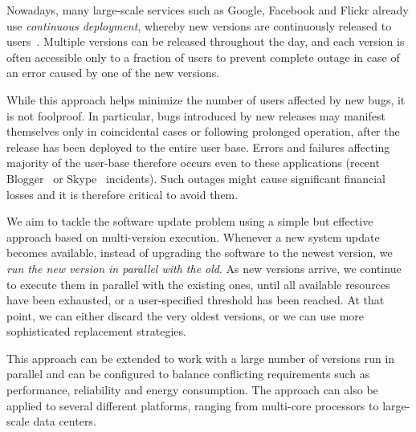Nowadays, many large-scale services such as Google, Facebook and Flickr already
use {\it continuous deployment}, whereby new versions are continuously released
to users~\cite{johnson2009}.  Multiple versions can be released throughout the
day, and each version is often accessible only to a fraction of users to
prevent complete outage in case of an error caused by one of the new versions.

While this approach helps minimize the number of users affected by new bugs, it
is not foolproof. In particular, bugs introduced by new releases may manifest
themselves only in coincidental cases or following prolonged operation, after
the release has been deployed to the entire user base. Errors and failures
affecting majority of the user-base therefore occurs even to these applications
(\eg recent Blogger~\cite{blogger-incident2011} or
Skype~\cite{skype-incident2011} incidents). Such outages might cause
significant financial losses and it is therefore critical to avoid them.

We aim to tackle the software update problem using a simple but effective
approach based on multi-version execution.
Whenever a new system update becomes available, instead of upgrading the
software to the newest version, we {\it run the new version in parallel with
the old}. As new versions arrive, we continue to execute them in parallel with
the existing ones, until all available resources have been exhausted, or a
user-specified threshold has been reached.  At that point, we can either
discard the very oldest versions, or we can use more sophisticated replacement
strategies.

This approach can be extended to work with a large number of
versions run in parallel and can be configured to balance conflicting
requirements such as performance, reliability and energy consumption. The
approach can also be applied to several different platforms, ranging from
multi-core processors to large-scale data centers.



